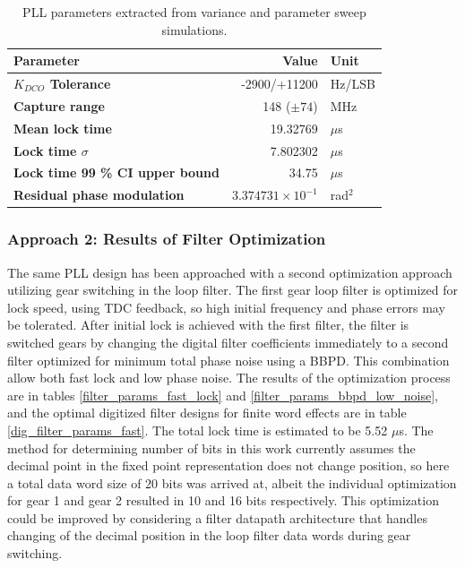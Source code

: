 \begin{table}[h!]
	\centering
	\def\arraystretch{1.5}		
	\setlength\arrayrulewidth{0.75pt}
	\setlength{\tabcolsep}{1em} %
	\begin{tabular}{|l|r|l|}
		\hline 
		\rule[-1ex]{0pt}{2.5ex} \cellcolor{gray!40}\textbf{Parameter} & \cellcolor{gray!40}\textbf{Value} & \cellcolor{gray!40}\textbf{Unit }\\ 
		\hline 
		\rule[-1ex]{0pt}{2.5ex} \textbf{$K_{DCO}$ Tolerance}  & -2900/+11200 & Hz/LSB \\ 
		\hline 
		\rule[-1ex]{0pt}{2.5ex} \textbf{Capture range}  & 148 ($\pm 74$)& MHz\\ 
		\hline 
		\rule[-1ex]{0pt}{2.5ex} \textbf{Mean lock time}  & 19.32769& $\mu$s \\ 
		\hline 
		\rule[-1ex]{0pt}{2.5ex} \textbf{Lock time $\sigma$} & 7.802302 & $\mu$s\\ 
		\hline 
		\rule[-1ex]{0pt}{2.5ex} \textbf{Lock time 99 \% CI upper bound} & 34.75  & $\mu$s\\ 
		\hline 
		\rule[-1ex]{0pt}{2.5ex} \textbf{Residual phase modulation} & $3.374731\times10^{-1}$  & rad$^2$\\ 
		\hline 
	\end{tabular} 

	\caption{PLL parameters extracted from variance and parameter sweep simulations.}
	\label{simulation_params}
\end{table}

\subsubsection{Approach 2: Results of Filter Optimization}
The same PLL design has been approached with a second optimization approach utilizing gear switching in the loop filter. The first gear loop filter is optimized for lock speed, using TDC feedback, so high initial frequency and phase errors may be tolerated. After initial lock is achieved with the first filter, the filter is switched gears by changing the digital filter coefficients immediately to a second filter optimized for minimum total phase noise using a BBPD. This combination allow both fast lock and low phase noise. The results of the optimization process are in tables \ref{filter_params_fast_lock} and \ref{filter_params_bbpd_low_noise}, and the optimal digitized filter designs for finite word effects are in table \ref{dig_filter_params_fast}. The total lock time is estimated to be 5.52 $\mu$s. The method for determining number of bits in this work currently assumes the decimal point in the fixed point representation does not change position, so here a total data word size of 20 bits was arrived at, albeit the individual optimization for gear 1 and gear 2 resulted in 10 and 16 bits respectively. This optimization could be improved by considering a filter datapath architecture that handles changing of the decimal position in the loop filter data words during gear switching.


